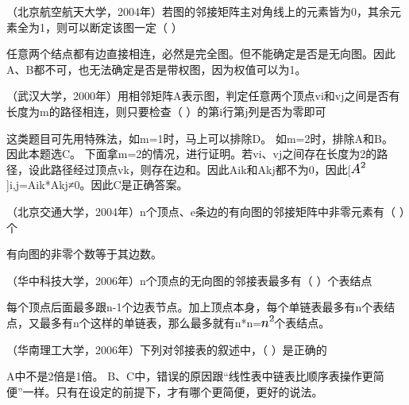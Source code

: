 \question （北京航空航天大学，2004年）若图的邻接矩阵主对角线上的元素皆为0，其余元素全为1，则可以断定该图一定（
）
\par{}
\begin{solution}任意两个结点都有边直接相连，必然是完全图。但不能确定是否是无向图。因此A、B都不可，也无法确定是否是带权图，因为权值可以为1。
\end{solution}
\question （武汉大学，2000年）用相邻矩阵A表示图，判定任意两个顶点vi和vj之间是否有长度为m的路径相连，则只要检查（
）的第i行第j列是否为零即可
\par{}
\begin{solution}这类题目可先用特殊法，如m=1时，马上可以排除D。 如m=2时，排除A和B。
因此本题选C。
下面拿m=2的情况，进行证明。若vi、vj之间存在长度为2的路径，设此路径经过顶点vk，则存在边和。因此Aik和Akj都不为0，因此{[}\includegraphics[width=0.18750in,height=0.15625in]
{texmath/99dc305Cdpi7B3507DA5E2}{]}i,j=Aik*Akj≠0。因此C是正确答案。
\end{solution}
\question （北京交通大学，2004年）n个顶点、e条边的有向图的邻接矩阵中非零元素有（
）个
\par{}
\begin{solution}有向图的非零个数等于其边数。
\end{solution}
\question （华中科技大学，2006年）n个顶点的无向图的邻接表最多有（ ）个表结点
\par{}
\begin{solution}每个顶点后面最多跟n-1个边表节点。加上顶点本身，每个单链表最多有n个表结点，又最多有n个这样的单链表，那么最多就有n*n=\includegraphics[width=0.16667in,height=0.15625in]{texmath/071fa15Cdpi7B3507Dn5E2}个表结点。
\end{solution}
\question （华南理工大学，2006年）下列对邻接表的叙述中，（ ）是正确的
\par{}
\begin{solution}A中不是2倍是1倍。
B、C中，错误的原因跟``线性表中链表比顺序表操作更简便''一样。只有在设定的前提下，才有哪个更简便，更好的说法。
\end{solution}
